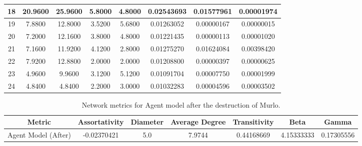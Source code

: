 \documentclass[12pt,a4paper]{thesis}
\begin{document}
\begin{table}[H]
\begin{tabular}{|c|c|c|c|c|c|c|c|}
\hline	18	&	20.9600	&	25.9600	&	5.8000	&	4.8000	&	0.02543693	&	0.01577961	&	0.00001974	\\
\hline	19	&	7.8800	&	12.8000	&	3.5200	&	5.6800	&	0.01263052	&	0.00000167	&	0.00000015	\\
\hline	20	&	7.2000	&	12.1600	&	3.8000	&	4.8000	&	0.01221435	&	0.00000113	&	0.00001020	\\
\hline	21	&	7.1600	&	11.9200	&	4.1200	&	2.8000	&	0.01275270	&	0.01624084	&	0.00398420	\\
\hline	22	&	7.9200	&	12.8800	&	2.0000	&	2.0000	&	0.01208800	&	0.00000397	&	0.00000625	\\
\hline	23	&	4.9600	&	9.9600	&	3.1200	&	5.1200	&	0.01091704	&	0.00007750	&	0.00001999	\\
\hline	24	&	4.8400	&	4.8400	&	2.2000	&	3.0000	&	0.01032283	&	0.00004596	&	0.00003502	\\
\hline 
\end{tabular} 
\label{tab:agentNodeBefore}
\end{table}


\begin{table}[H]
\centering
\caption{Network metrics for Agent model after the destruction of Murlo.}
\tiny
\begin{tabular}{|c|c|c|c|c|c|c|}
\hline Metric & Assortativity & Diameter & Average Degree & Transitivity & Beta & Gamma \\ 
\hline Agent Model (After) & -0.02370421 & 5.0 & 7.9744 & 0.44168669 & 4.15333333 & 0.17305556 \\ 
\hline 
\end{tabular} 
\label{tab:agentNetAfter}
\end{table}
\end{document}

